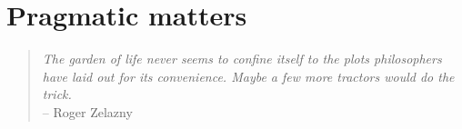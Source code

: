 

\chapter{Pragmatic matters~\label{ch:datahandling}}

\begin{quote}
{\it The garden of life never seems to confine itself to the plots philosophers have
laid out for its convenience. Maybe a few more tractors would do the trick.} \\ \hspace*{2cm} -- Roger Zelazny
\end{quote}


